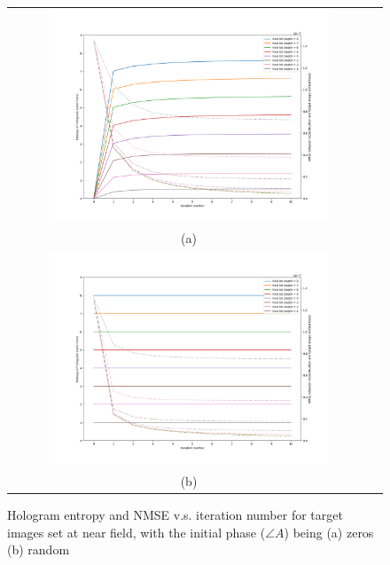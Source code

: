 	\begin{figure} [H]
		\begin{center}
			\begin{tabular}{c c}
				\includegraphics[trim={90 50 60 80}, clip, width = 0.8\textwidth]{GS_Fresnel0.1_iterations_zero_start.png} \\
				(a)\\
				\includegraphics[trim={90 50 60 80}, clip, width = 0.8\textwidth]{GS_Fresnel0.1_iterations_random_start.png} \\
				(b)
			\end{tabular}
			\caption{\label{fig:GS_Fresnel0.1_iterations} Hologram entropy and NMSE v.s. iteration number for target images set at near field, with the initial phase ($\angle A$) being (a) zeros (b) random}
		\end{center}
	\end{figure}

